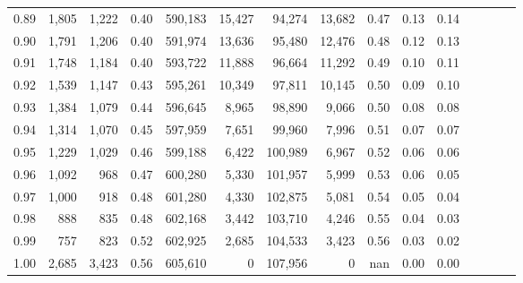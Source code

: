 \begin{tabular}{rrrcrrrrrrrrrrr}
0.89 &   1,805 &  1,222 &                                       0.40 &  590,183 &   15,427 &   94,274 &   13,682 &  0.47 &  0.13 &                         0.14 \\
0.90 &   1,791 &  1,206 &                                       0.40 &  591,974 &   13,636 &   95,480 &   12,476 &  0.48 &  0.12 &                         0.13 \\
0.91 &   1,748 &  1,184 &                                       0.40 &  593,722 &   11,888 &   96,664 &   11,292 &  0.49 &  0.10 &                         0.11 \\
0.92 &   1,539 &  1,147 &                                       0.43 &  595,261 &   10,349 &   97,811 &   10,145 &  0.50 &  0.09 &                         0.10 \\
0.93 &   1,384 &  1,079 &                                       0.44 &  596,645 &    8,965 &   98,890 &    9,066 &  0.50 &  0.08 &                         0.08 \\
0.94 &   1,314 &  1,070 &                                       0.45 &  597,959 &    7,651 &   99,960 &    7,996 &  0.51 &  0.07 &                         0.07 \\
0.95 &   1,229 &  1,029 &                                       0.46 &  599,188 &    6,422 &  100,989 &    6,967 &  0.52 &  0.06 &                         0.06 \\
0.96 &   1,092 &    968 &                                       0.47 &  600,280 &    5,330 &  101,957 &    5,999 &  0.53 &  0.06 &                         0.05 \\
0.97 &   1,000 &    918 &                                       0.48 &  601,280 &    4,330 &  102,875 &    5,081 &  0.54 &  0.05 &                         0.04 \\
0.98 &     888 &    835 &                                       0.48 &  602,168 &    3,442 &  103,710 &    4,246 &  0.55 &  0.04 &                         0.03 \\
0.99 &     757 &    823 &                                       0.52 &  602,925 &    2,685 &  104,533 &    3,423 &  0.56 &  0.03 &                         0.02 \\
1.00 &   2,685 &  3,423 &                                       0.56 &  605,610 &        0 &  107,956 &        0 &   nan &  0.00 &                         0.00 \\
\bottomrule
\end{tabular}
